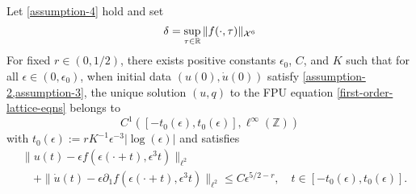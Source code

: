 \begin{theorem}
	Let \cref{assumption-4} hold and set 
	\begin{equation*}
		\delta =\sup_{\tau\in\mathbb{R}}\|f(\cdot,\tau)\|_{\mathcal{X}^6}
	\end{equation*}
	For fixed \(r\in(0,1/2)\), there exists positive constants \(\epsilon_0\), \(C\), and \(K\) such that for all \(\epsilon \in(0,\epsilon_0)\), when initial data \((u(0), \dot u(0))\) satisfy \cref{assumption-2,assumption-3}, the unique solution \((u,q)\) to the FPU equation \cref{first-order-lattice-eqns} belongs to 
	\begin{equation*}
		C^1([-t_0(\epsilon), t_0(\epsilon)], \ell^\infty(\mathbb Z))
	\end{equation*}
	with \(t_0(\epsilon):= r K^{-1} \epsilon^{-3} | \log (\epsilon) | \) and satisfies
	\begin{equation*}
	\begin{aligned}
		&\| u(t) - \epsilon f(\epsilon(\cdot+t), \epsilon^3 t) \|_{\ell^2} \\
		&\quad + \| \dot u(t) - \epsilon \partial_1 f(\epsilon (\cdot +t),\epsilon^3t)  \|_{\ell^2} \leq C \epsilon^{5/2 - r}, \quad t\in[-t_0(\epsilon), t_0(\epsilon)].
	\end{aligned}
	\end{equation*}
\end{theorem}

